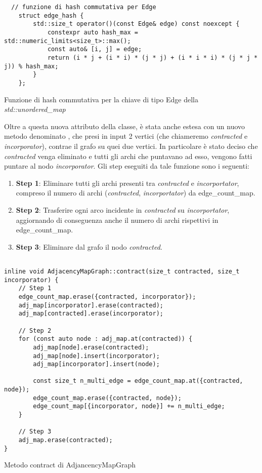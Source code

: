 \begin{listing}[!ht]
\begin{verbatim}
  // funzione di hash commutativa per Edge
    struct edge_hash {
        std::size_t operator()(const Edge& edge) const noexcept {
            constexpr auto hash_max = std::numeric_limits<size_t>::max();
            const auto& [i, j] = edge;
            return (i * j + (i * i) * (j * j) + (i * i * i) * (j * j * j)) % hash_max;
        }
    };
\end{verbatim}
\caption{Funzione di hash commutativa per la chiave di tipo Edge della \textit{std::unordered\_map}}
\label{listing:hash-fun}
\end{listing}

\noindent Oltre a questa nuova attributo della classe,  è stata anche estesa con un nuovo metodo denominato , che presi in input 2 vertici (che chiameremo \textit{contracted} e  \textit{incorporator}), contrae il grafo su quei due vertici. In particolare è stato deciso che \textit{contracted} venga eliminato e tutti gli archi che puntavano ad esso, vengono fatti puntare al nodo \textit{incorporator}. Gli step eseguiti da tale funzione sono i seguenti:
\begin{enumerate}
    \item \textbf{Step 1}: Eliminare tutti gli archi presenti tra \textit{contracted} e \textit{incorportator}, compreso il numero di archi (\textit{contracted}, \textit{incorportator}) da edge\_count\_map.
    
    \item \textbf{Step 2}: Trasferire ogni arco incidente in \textit{contracted} su \textit{incorportator}, aggiornando di conseguenza anche il numero di archi rispettivi in edge\_count\_map.
    
     \item \textbf{Step 3}: Eliminare dal grafo il nodo \textit{contracted}.
\end{enumerate}

\begin{listing}[!ht]
\begin{verbatim}

inline void AdjacencyMapGraph::contract(size_t contracted, size_t incorporator) {
    // Step 1
    edge_count_map.erase({contracted, incorporator});
    adj_map[incorporator].erase(contracted);
    adj_map[contracted].erase(incorporator);

    // Step 2
    for (const auto node : adj_map.at(contracted)) {
        adj_map[node].erase(contracted);
        adj_map[node].insert(incorporator);
        adj_map[incorporator].insert(node);

        const size_t n_multi_edge = edge_count_map.at({contracted, node});
        edge_count_map.erase({contracted, node});
        edge_count_map[{incorporator, node}] += n_multi_edge;
    }

    // Step 3
    adj_map.erase(contracted);
}
\end{verbatim}
\caption{Metodo contract di AdjancencyMapGraph}
\label{listing:met-contract}
\end{listing}


